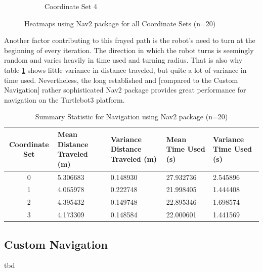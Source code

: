 \documentclass[%
paper=A4,               %
twoside=true,           %
openright,              %
11pt,                   %
bibliography=totoc,     %
titlepage=on,           %
DIV=12,                 %
BCOR=1.5cm,             %
parskip=half,            %
final
]{scrreprt}
\begin{document}
\begin{figure}[H]
\begin{subfigure}[b]{0.45\textwidth}
			\caption{Coordinate Set 4}
			\label{fig:fig13}
		\end{subfigure}
		\caption{Heatmaps using Nav2 package for all Coordinate Sets (n=20)}
		\label{fig:heatmaps}
	\end{figure}
	
	Another factor contributing to this frayed path is the robot's need to turn at the beginning of every iteration. The direction in which the robot turns is seemingly random and varies heavily in time used and turning radius. That is also why table \ref{tab:1} shows little variance in distance traveled, but quite a lot of variance in time used. \newline 
	Nevertheless, the long established and [compared to the Custom Navigation] rather sophisticated Nav2 package provides great performance for navigation on the Turtlebot3 platform.  

	
	
	\begin{table}[H]
		\centering
		\begin{tabular}{|c|p{3cm}|p{3cm}|p{3cm}|p{3cm}|}
			\hline
			Coordinate Set & Mean Distance \newline Traveled (m) & Variance Distance \newline Traveled (m) & Mean Time \newline Used (s) & Variance Time \newline Used (s) \\
			\hline
			0 & 5.306683 & 0.148930 & 27.932736 & 2.545896 \\
			1 & 4.065978 & 0.222748 & 21.998405 & 1.444408 \\
			2 & 4.395432 & 0.149748 & 22.895346 & 1.698574 \\
			3 & 4.173309 & 0.148584 & 22.000601 & 1.441569 \\
			\hline
		\end{tabular}
		\caption{Summary Statistic for Navigation using Nav2 package (n=20)}
		\label{tab:1}
	\end{table}
	
	
	\subsection{Custom Navigation}
	tbd
	
\end{document}
